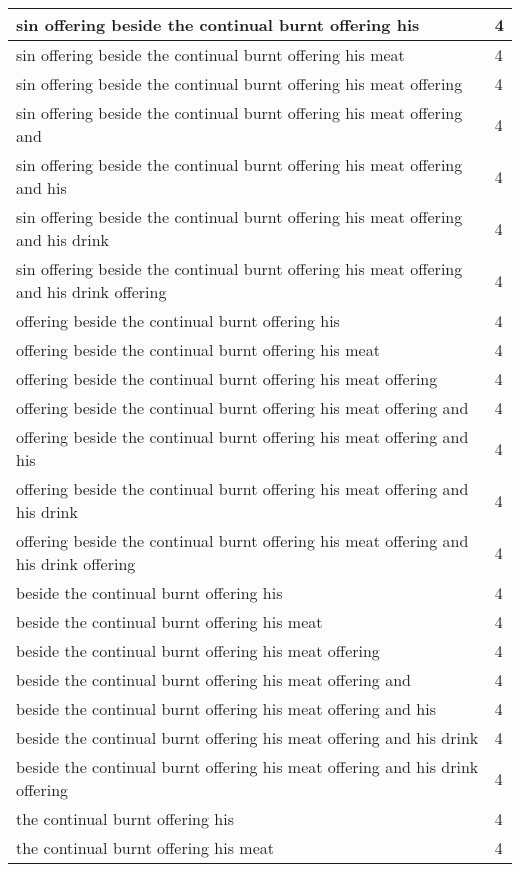 \begin{center}
\begin{longtable}{|p{3.0in}|p{0.5in}|}
sin offering beside the continual burnt offering his & 4\\ \hline 
sin offering beside the continual burnt offering his meat & 4\\ \hline 
sin offering beside the continual burnt offering his meat offering & 4\\ \hline 
sin offering beside the continual burnt offering his meat offering and & 4\\ \hline 
sin offering beside the continual burnt offering his meat offering and his & 4\\ \hline 
sin offering beside the continual burnt offering his meat offering and his drink & 4\\ \hline 
sin offering beside the continual burnt offering his meat offering and his drink offering & 4\\ \hline 
offering beside the continual burnt offering his & 4\\ \hline 
offering beside the continual burnt offering his meat & 4\\ \hline 
offering beside the continual burnt offering his meat offering & 4\\ \hline 
offering beside the continual burnt offering his meat offering and & 4\\ \hline 
offering beside the continual burnt offering his meat offering and his & 4\\ \hline 
offering beside the continual burnt offering his meat offering and his drink & 4\\ \hline 
offering beside the continual burnt offering his meat offering and his drink offering & 4\\ \hline 
beside the continual burnt offering his & 4\\ \hline 
beside the continual burnt offering his meat & 4\\ \hline 
beside the continual burnt offering his meat offering & 4\\ \hline 
beside the continual burnt offering his meat offering and & 4\\ \hline 
beside the continual burnt offering his meat offering and his & 4\\ \hline 
beside the continual burnt offering his meat offering and his drink & 4\\ \hline 
beside the continual burnt offering his meat offering and his drink offering & 4\\ \hline 
the continual burnt offering his & 4\\ \hline 
the continual burnt offering his meat & 4\\ \hline 

\end{longtable}
\end{center}
